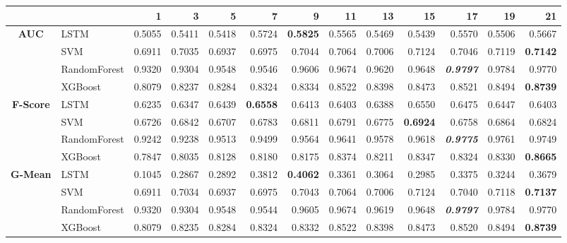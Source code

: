 \begin{table}[H]
	\centering
	\begin{adjustbox}{max width=14cm}
		\begin{tabular}{|c|l|r|r|r|r|r|r|r|r|r|r|r|}
			\hline
			&         &      1  &      3  &      5  &      7  &      9  &      11 &      13 &      15 &      17 &      19 &      21 \\
			\hline
			\textbf{AUC} &  LSTM &  0.5055 &  0.5411 &  0.5418 &  0.5724 & \textbf{  0.5825 } &  0.5565 &  0.5469 &  0.5439 &  0.5570 &  0.5506 &  0.5667 \\
			&  SVM &  0.6911 &  0.7035 &  0.6937 &  0.6975 &  0.7044 &  0.7064 &  0.7006 &  0.7124 &  0.7046 &  0.7119 & \textbf{  0.7142 } \\
			&  RandomForest &  0.9320 &  0.9304 &  0.9548 &  0.9546 &  0.9606 &  0.9674 &  0.9620 &  0.9648 & \textit{ \textbf{  0.9797 } } &  0.9784 &  0.9770 \\
			&  XGBoost &  0.8079 &  0.8237 &  0.8284 &  0.8324 &  0.8334 &  0.8522 &  0.8398 &  0.8473 &  0.8521 &  0.8494 & \textbf{  0.8739 } \\			
			\hline
			\textbf{F-Score} &  LSTM &  0.6235 &  0.6347 &  0.6439 & \textbf{  0.6558 } &  0.6413 &  0.6403 &  0.6388 &  0.6550 &  0.6475 &  0.6447 &  0.6403 \\
			&  SVM &  0.6726 &  0.6842 &  0.6707 &  0.6783 &  0.6811 &  0.6791 &  0.6775 & \textbf{  0.6924 } &  0.6758 &  0.6864 &  0.6824 \\
			&  RandomForest &  0.9242 &  0.9238 &  0.9513 &  0.9499 &  0.9564 &  0.9641 &  0.9578 &  0.9618 & \textit{ \textbf{  0.9775 } } &  0.9761 &  0.9749 \\
			&  XGBoost &  0.7847 &  0.8035 &  0.8128 &  0.8180 &  0.8175 &  0.8374 &  0.8211 &  0.8347 &  0.8324 &  0.8330 & \textbf{  0.8665 } \\			
			\hline
			\textbf{G-Mean} &  LSTM &  0.1045 &  0.2867 &  0.2892 &  0.3812 & \textbf{  0.4062 } &  0.3361 &  0.3064 &  0.2985 &  0.3375 &  0.3244 &  0.3679 \\
			&  SVM &  0.6911 &  0.7034 &  0.6937 &  0.6975 &  0.7043 &  0.7064 &  0.7006 &  0.7124 &  0.7040 &  0.7118 & \textbf{  0.7137 } \\
			&  RandomForest &  0.9320 &  0.9304 &  0.9548 &  0.9544 &  0.9605 &  0.9674 &  0.9619 &  0.9648 & \textit{ \textbf{  0.9797 } } &  0.9784 &  0.9770 \\
			&  XGBoost &  0.8079 &  0.8235 &  0.8284 &  0.8324 &  0.8332 &  0.8522 &  0.8398 &  0.8473 &  0.8520 &  0.8494 & \textbf{  0.8739 } \\			

\end{tabular}
\end{adjustbox}
\end{table}

